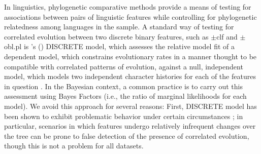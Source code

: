 \documentclass[11pt]{article}
\def\citeapos#1{\citeauthor{#1}'s (\citeyear{#1})}
\begin{document}
In linguistics, phylogenetic comparative methods provide a means of testing for associations between pairs of linguistic features while controlling for phylogenetic relatedness among languages in the sample. 
A standard way of testing for correlated evolution between two discrete binary features, such as {\sc $\pm$clf} and {\sc $\pm$obl.pl} is \citeapos{Pagel1994} DISCRETE model, which assesses the relative model fit of a dependent model, which constrains evolutionary rates in a manner thought to be compatible with correlated patterns of evolution, against a null, independent model, which models two independent character histories for each of the features in question \citep{PagelMeade2006,Dunnetal2011}. 
In the Bayesian context, a common practice is to carry out this assessment using Bayes Factors (i.e., the ratio of marginal likelihoods for each model). We avoid this approach for several reasons: 
First, DISCRETE model has been shown to exhibit problematic behavior under certain circumstances \citep{MaddisonFitzjohn2014}; in particular, scenarios in which features undergo relatively infrequent changes over the tree can be prone to false detection of the presence of correlated evolution, though this is not a problem for all datasets.
\end{document}
